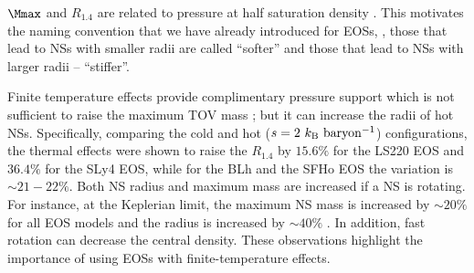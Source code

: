 $\Mmax$ and $R_{1.4}$ are related to pressure at half saturation density \citep{Lattimer:2012nd}.
This motivates the naming convention that we have already introduced 
for \acp{EOS}, \ie, those that lead to \acp{NS} with smaller 
radii are called ``softer'' and those that lead to \acp{NS} with larger radii 
-- ``stiffer''. 

Finite temperature effects provide complimentary pressure support 
which is not sufficient to raise the maximum \ac{TOV} mass 
\citep{Kaplan:2013wra}; but it can increase the radii of hot \acp{NS}.
Specifically, comparing the cold and hot ($s=2~{k_{\rm B}~{\rm baryon^{-1}}}$)
configurations, the thermal effects were shown to raise the $R_{1.4}$
by $15.6 \%$ for the LS220 \ac{EOS} and $36.4 \%$ for the SLy4 EOS, 
while for the BLh and the SFHo \ac{EOS} the variation is $\sim 21-22 \%$.
%
Both \ac{NS} radius and maximum mass are increased if a \ac{NS} is rotating. 
For instance, at the Keplerian limit, the maximum \ac{NS} mass is increased by 
$\sim 20\%$ for all \ac{EOS} models and the radius is increased by $\sim 40\%$ \citep{Bernuzzi:2020txg}. 
In addition, fast rotation can decrease the central density.
%
These observations highlight the importance of using \acp{EOS} with 
finite-temperature effects. 




